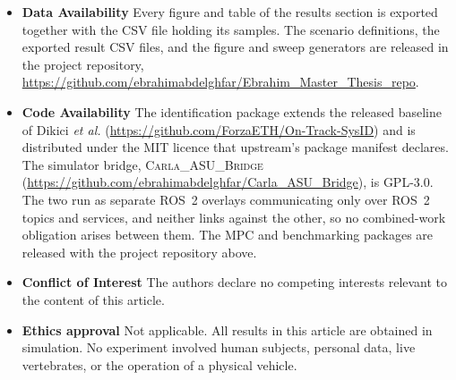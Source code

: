 \documentclass[12pt]{sn-jnl}
\begin{document}
\begin{itemize}
\item \textbf{Data Availability}
Every figure and table of the results section is exported together with the CSV
file holding its samples. The scenario definitions, the exported result CSV
files, and the figure and sweep generators are released in the project
repository,
\url{https://github.com/ebrahimabdelghfar/Ebrahim_Master_Thesis_repo}.

\item \textbf{Code Availability}
The identification package extends the released baseline of Dikici \emph{et
al.} (\url{https://github.com/ForzaETH/On-Track-SysID}) and is distributed
under the MIT licence that upstream's package manifest declares. The
simulator bridge, \textsc{Carla\_ASU\_Bridge}
(\url{https://github.com/ebrahimabdelghfar/Carla_ASU_Bridge}), is GPL-3.0. The
two run as separate ROS~2 overlays communicating only over ROS~2 topics and
services, and neither links against the other, so no combined-work obligation
arises between them. The MPC and benchmarking packages are released with the
project repository above.

\item \textbf{Conflict of Interest}
The authors declare no competing interests relevant to the content of this
article.

\item \textbf{Ethics approval}
Not applicable. All results in this article are obtained in simulation. No
experiment involved human subjects, personal data, live vertebrates, or the
operation of a physical vehicle.
\end{itemize}
\end{document}

